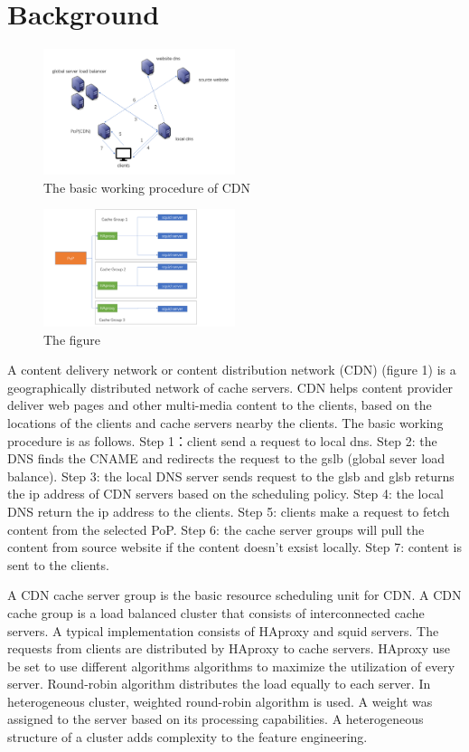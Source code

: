 \documentclass[5p]{elsarticle}
\begin{document}
\section{Background}
\begin{figure}[h]
    \centering
    \includegraphics[width=0.5\textwidth]{CDN_new.png}
    \caption{The basic working procedure of CDN}
    \label{fig}
\end{figure}

\begin{figure}[h]
    \centering
    \includegraphics[width=0.5\textwidth]{cache_group.png}
    \caption{The figure}
    \label{fig: the structure of PoP}
\end{figure}

A content delivery network or content distribution network (CDN) (figure 1) is a geographically distributed network of cache servers. CDN helps content provider deliver web pages and other multi-media content to the clients, based on the locations of the clients and cache servers nearby the clients. The basic working procedure is as follows. Step 1：client send a request to local dns. Step 2: the DNS finds the CNAME and redirects the request to the gslb (global sever load balance). Step 3: the local DNS server sends request to the glsb and glsb returns the ip address of CDN servers based on the scheduling policy. Step 4: the local DNS return the ip address to the clients. Step 5: clients make a request to fetch content from the selected PoP. Step 6: the cache server groups will pull the content from source website if the content doesn't exsist locally. Step 7: content is sent to the clients.

A CDN cache server group is the basic resource scheduling unit for CDN. A CDN cache group is a load balanced cluster that consists of interconnected cache servers. A typical implementation consists of HAproxy and squid servers. The requests from clients are distributed by HAproxy to cache servers. HAproxy use be set to use different algorithms algorithms to maximize the utilization of every server. Round-robin algorithm distributes the load equally to each server. In heterogeneous cluster,  weighted round-robin algorithm is used. A weight was assigned to the server based on its processing capabilities. A heterogeneous structure of a cluster adds complexity to the feature engineering.
\end{document}
